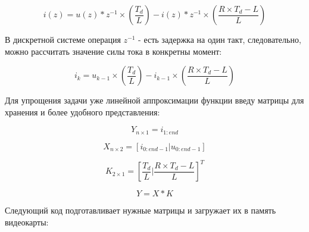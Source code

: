 \documentclass[12pt]{report}
\begin{document}
\[
i(z) = u(z)*z^{-1} \times (\dfrac{T_d}{L}) - i(z)*z^{-1} \times (\dfrac{R \times T_d - L}{L})
\]

В дискретной системе операция \(z^{-1}\) - есть задержка на один такт,
следовательно, можно рассчитать значение силы тока в конкретны момент:

\[
i_{k} = u_{k-1} \times (\dfrac{T_d}{L}) - i_{k-1} \times (\dfrac{R \times T_d - L}{L})
\]

    Для упрощения задачи уже линейной аппроксимации функции введу матрицы
для хранения и более удобного представления:

\[
Y_{n \times 1} = i_{1:end}
\]

\[
X_{n \times 2} = [ i_{0:end-1} | u_{0:end-1} ]
\]

\[
K_{2 \times 1} = [\dfrac{T_d}{L} | \dfrac{R \times T_d - L}{L}]^{T}
\]

\[
Y = X * K
\]

Следующий код подготавливает нужные матрицы и загружает их в память
видеокарты:

    
\end{document}
